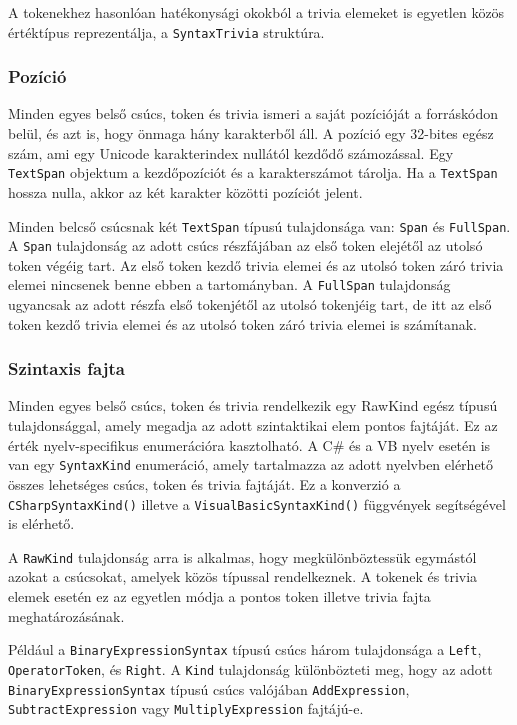 \documentclass[12pt, a4paper]{report}
\newcommand{\f}[1]{\texttt{#1}}
\begin{document}
A tokenekhez hasonlóan hatékonysági okokból a trivia elemeket is egyetlen közös értéktípus reprezentálja, a \f{SyntaxTrivia} struktúra.

\subsubsection{Pozíció}

Minden egyes belső csúcs, token és trivia ismeri a saját pozícióját a forráskódon belül, és azt is, hogy önmaga hány karakterből áll. A pozíció egy 32-bites egész szám, ami egy Unicode karakterindex nullától kezdődő számozással. Egy \f{TextSpan} objektum a kezdőpozíciót és a karakterszámot tárolja. Ha a \f{TextSpan} hossza nulla, akkor az két karakter közötti pozíciót jelent.

Minden belcső csúcsnak két \f{TextSpan} típusú tulajdonsága van: \f{Span} és \f{FullSpan}. A \f{Span} tulajdonság az adott csúcs részfájában az első token elejétől az utolsó token végéig tart. Az első token kezdő trivia elemei és az utolsó token záró trivia elemei nincsenek benne ebben a tartományban. A \f{FullSpan} tulajdonság ugyancsak az adott részfa első tokenjétől az utolsó tokenjéig tart, de itt az első token kezdő trivia elemei és az utolsó token záró trivia elemei is számítanak.

\subsubsection{Szintaxis fajta}

Minden egyes belső csúcs, token és trivia rendelkezik egy RawKind egész típusú tulajdonsággal, amely megadja az adott szintaktikai elem pontos fajtáját. Ez az érték nyelv-specifikus enumerációra kasztolható. A C\# és a VB nyelv esetén is van egy \f{SyntaxKind} enumeráció, amely tartalmazza az adott nyelvben elérhető összes lehetséges csúcs, token és trivia fajtáját. Ez a konverzió a \f{CSharpSyntaxKind()} illetve a \f{VisualBasicSyntaxKind()} függvények segítségével is elérhető.

A \f{RawKind} tulajdonság arra is alkalmas, hogy megkülönböztessük egymástól azokat a csúcsokat, amelyek közös típussal rendelkeznek. A tokenek és trivia elemek esetén ez az egyetlen módja a pontos token illetve trivia fajta meghatározásának.

Például a \f{BinaryExpressionSyntax} típusú csúcs három tulajdonsága a \f{Left}, \f{OperatorToken}, és \f{Right}. A \f{Kind} tulajdonság különbözteti meg, hogy az adott \f{BinaryExpressionSyntax} típusú csúcs valójában \f{AddExpression}, \f{SubtractExpression} vagy \f{MultiplyExpression} fajtájú-e.
\end{document}
